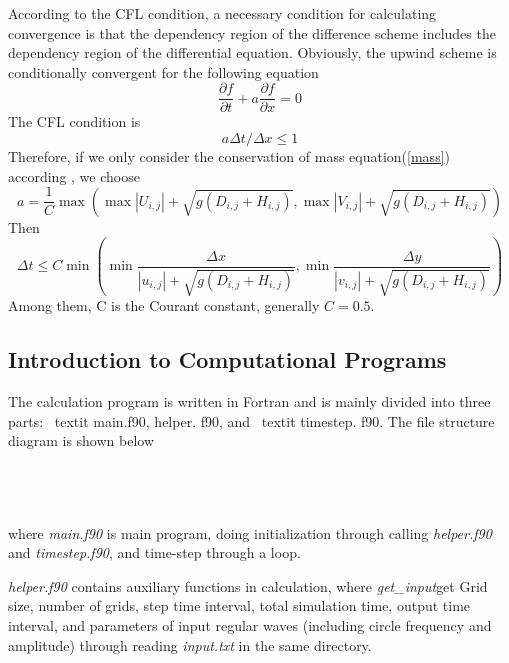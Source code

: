 \documentclass[10pt,a4paper]{article}
\begin{document}
According to the CFL condition, a necessary condition for calculating convergence is that the dependency region of the difference scheme includes the dependency region of the differential equation. Obviously, the upwind scheme is conditionally convergent for the following equation
\begin{equation}
	\frac{\partial f}{\partial t} + a \frac{\partial f}{\partial x} = 0
\end{equation}
The CFL condition is
\begin{equation}
	a\Delta t / \Delta x \le 1
\end{equation}
Therefore, if we only consider the conservation of mass equation(\ref{mass}) according \cite{4}, we choose
\begin{equation}
	a = \frac{1}{C}\max\left(\max|U_{i, j}| + \sqrt{g(D_{i, j} + H_{i, j})}, \max|V_{i, j}| + \sqrt{g(D_{i, j} + H_{i, j})}\right)
\end{equation}
Then 
\begin{equation}\label{convergence}
	\Delta t \le C\min\left(\min\frac{\Delta x}{|u_{i, j}| + \sqrt{g(D_{i, j} + H_{i, j})}}, \min\frac{\Delta y}{|v_{i, j}| + \sqrt{g(D_{i, j} + H_{i, j})}}\right)
\end{equation}
Among them, C is the Courant constant, generally $C = 0.5$.
\subsection{Introduction to Computational Programs}
The calculation program is written in Fortran and is mainly divided into three parts: \ textit {main.f90, helper. f90}, and \ textit {timestep. f90}. The file structure diagram is shown below
\\
\\
\\
\\

where \textit{main.f90} is main program, doing initialization through calling \textit{helper.f90} and \textit{timestep.f90}, and time-step through a loop.

\textit{helper.f90} contains auxiliary functions in calculation, where \textit{get\_input}get Grid size, number of grids, step time interval, total simulation time, output time interval, and parameters of input regular waves (including circle frequency and amplitude) through reading \textit{input.txt} in the same directory.
\end{document}
